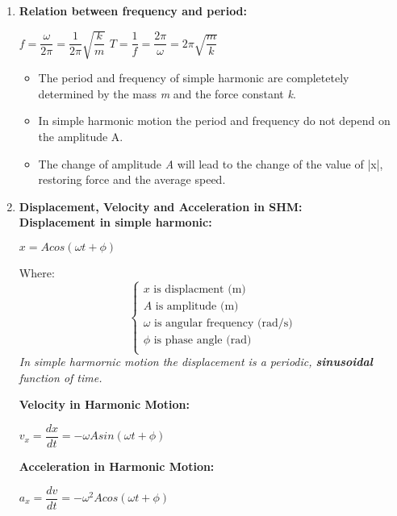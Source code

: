 \documentclass[10pt]{article}
\begin{document}
\begin{enumerate}
		\bigbreak
		\item \textbf{Relation between frequency and period: } \\
		\begin{mybox}
			\begin{center}
				$f = \dfrac{\omega}{2 \pi} = \dfrac{1}{2 \pi} \sqrt{\dfrac{k}{m}}$
				\bigbreak
				$T = \dfrac{1}{f} = \dfrac{2 \pi} {\omega} = 2 \pi \sqrt{\dfrac{m}{k}}$
			\end{center}
		\end{mybox}
		\bigbreak
		\begin{itemize}
			\item The period and frequency of simple harmonic are completetely determined by the mass \textit{m} and the force constant \textit{k}.
			\item In simple harmonic motion the period and frequency do not depend on the amplitude A.
			\item The change of amplitude \textit{A} will lead to the change of the value of |x|, restoring force and the average speed. 
		\end{itemize}

		\bigbreak
		\item \textbf{Displacement, Velocity and Acceleration in SHM: } \\
		\textbf{Displacement in simple harmonic: } \\
		\begin{mybox}
			\begin{center}
				$x = Acos(\omega t + \phi)$
			\end{center}
		\end{mybox}
		Where:
		$$
		\begin{cases}
			x \mbox{ is displacment (m)} \\
			A \mbox{ is amplitude (m)} \\
			\omega \mbox{ is angular frequency (rad/s)} \\
			\phi \mbox{ is phase angle (rad)} \\
		\end{cases}
		$$
		\bigbreak
		\textit{In simple harmornic motion the displacement is a periodic, \textbf{sinusoidal} function of time.}

		\bigbreak
		\textbf{Velocity in Harmonic Motion: } \\
		\begin{mybox}
			\begin{center}
				$v_{x} = \dfrac{dx}{dt} = - \omega A sin(\omega t + \phi)$
			\end{center}
		\end{mybox}
		\bigbreak
		\textbf{Acceleration in Harmonic Motion: } \\
		\begin{mybox}
			\begin{center}
				$a_{x} = \dfrac{dv}{dt} = - \omega^{2} A cos(\omega t + \phi)$
			\end{center}
		\end{mybox}


\end{enumerate}
\end{document}
